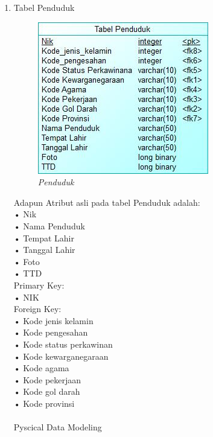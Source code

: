 \documentclass[12pt,a4paper,bahasa]{article}
\begin{document}
\begin{enumerate}
\item Tabel Penduduk\\
\begin{figure}[!htbp]
\centering
\includegraphics[scale=0.8]{gambar/Penduduk.jpeg}
\caption{\textit{Penduduk}}
\label{Penduduk}
\end{figure}
Adapun Atribut asli pada tabel Penduduk adalah:\\
•	Nik\\
•	Nama Penduduk\\
•	Tempat Lahir\\
•	Tanggal Lahir\\
•	Foto\\
•	TTD\\
Primary Key:\\
•	NIK\\
Foreign Key:\\
•	Kode jenis kelamin\\
•	Kode pengesahan\\
•	Kode status perkawinan\\
•	Kode kewarganegaraan\\
•	Kode agama\\
•	Kode pekerjaan\\
•	Kode gol darah\\
•	Kode provinsi\\
\\
Pyscical Data Modeling 
\end{enumerate}
\end{document}
